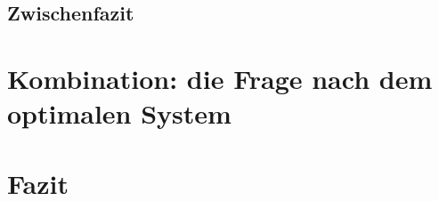 \documentclass[
  DIV=calc,
  BCOR=5mm,
  11pt,
  headings=small,
  oneside,
  abstract=true,
  toc=bib,
  english,ngerman]{scrartcl}
\begin{document}
 

 



 

 

 

 

 



 



 

 

 

 

 
 
 

 

 

 
\subsection{Zwischenfazit}


\section{Kombination: die Frage nach dem optimalen System}

\section{Fazit}

%


%
\printnomenclature


\end{document}
